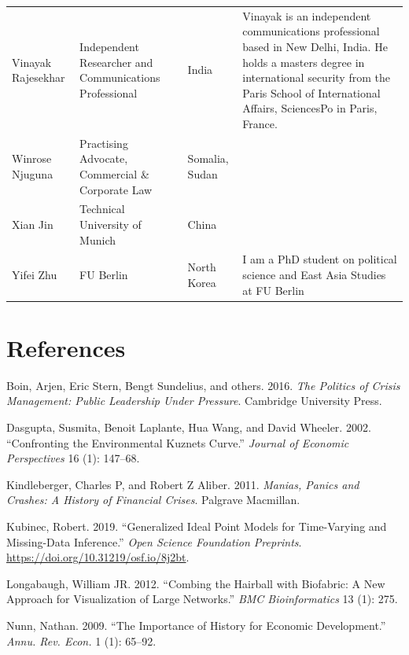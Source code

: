 \documentclass[]{article}
\begin{document}
\begin{longtable}{l>{\raggedright\arraybackslash}p{2cm}>{\raggedright\arraybackslash}p{2cm}>{\raggedright\arraybackslash}p{3cm}}
\rowcolor{gray!6}  Vinayak Rajesekhar & Independent Researcher and Communications Professional & India & Vinayak is an independent communications professional based in New Delhi, India. He holds a masters degree in international security from the Paris School of International Affairs, SciencesPo in Paris, France.\\
Winrose Njuguna & Practising Advocate, Commercial \& Corporate Law & Somalia, Sudan & \\
\rowcolor{gray!6}  Xian Jin & Technical University of Munich & China & \\
\addlinespace
Yifei Zhu & FU Berlin & North Korea & I am a PhD student on political science and East Asia Studies at FU Berlin\\
\bottomrule
\end{longtable}

\hypertarget{references}{%
\section*{References}\label{references}}

\hypertarget{refs}{}
\leavevmode\hypertarget{ref-boin2016politics}{}%
Boin, Arjen, Eric Stern, Bengt Sundelius, and others. 2016. \emph{The Politics of Crisis Management: Public Leadership Under Pressure}. Cambridge University Press.

\leavevmode\hypertarget{ref-dasgupta2002confronting}{}%
Dasgupta, Susmita, Benoit Laplante, Hua Wang, and David Wheeler. 2002. ``Confronting the Environmental Kuznets Curve.'' \emph{Journal of Economic Perspectives} 16 (1): 147--68.

\leavevmode\hypertarget{ref-kindleberger2011manias}{}%
Kindleberger, Charles P, and Robert Z Aliber. 2011. \emph{Manias, Panics and Crashes: A History of Financial Crises}. Palgrave Macmillan.

\leavevmode\hypertarget{ref-kubinec2019ideal}{}%
Kubinec, Robert. 2019. ``Generalized Ideal Point Models for Time-Varying and Missing-Data Inference.'' \emph{Open Science Foundation Preprints}. \url{https://doi.org/10.31219/osf.io/8j2bt}.

\leavevmode\hypertarget{ref-longabaugh2012}{}%
Longabaugh, William JR. 2012. ``Combing the Hairball with Biofabric: A New Approach for Visualization of Large Networks.'' \emph{BMC Bioinformatics} 13 (1): 275.

\leavevmode\hypertarget{ref-nunn2009importance}{}%
Nunn, Nathan. 2009. ``The Importance of History for Economic Development.'' \emph{Annu. Rev. Econ.} 1 (1): 65--92.
\end{document}
